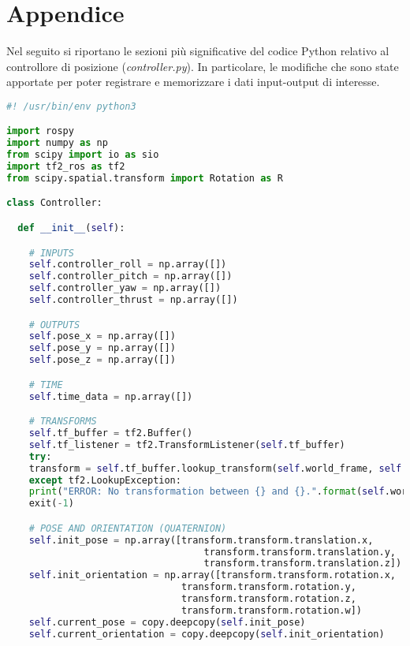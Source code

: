 
\chapter*{Appendice}\label{ch:appendix}

Nel seguito si riportano le sezioni più significative del codice Python relativo al controllore di posizione (\emph{controller.py}). In particolare, le modifiche che sono state apportate per poter registrare e memorizzare i dati input-output di interesse.\\

\begin{lstlisting}[language=Python, numbers=none]
#! /usr/bin/env python3

import rospy
import numpy as np
from scipy import io as sio
import tf2_ros as tf2
from scipy.spatial.transform import Rotation as R

class Controller:

  def __init__(self):

    # INPUTS
    self.controller_roll = np.array([])
    self.controller_pitch = np.array([])
    self.controller_yaw = np.array([])
    self.controller_thrust = np.array([])

    # OUTPUTS
    self.pose_x = np.array([])
    self.pose_y = np.array([])
    self.pose_z = np.array([])

    # TIME
    self.time_data = np.array([])

    # TRANSFORMS
    self.tf_buffer = tf2.Buffer()
    self.tf_listener = tf2.TransformListener(self.tf_buffer)
    try:
    transform = self.tf_buffer.lookup_transform(self.world_frame, self.drone_frame, rospy.Time(0), rospy.Duration(5))
    except tf2.LookupException:
    print("ERROR: No transformation between {} and {}.".format(self.world_frame, self.drone_frame))
    exit(-1)

    # POSE AND ORIENTATION (QUATERNION)
    self.init_pose = np.array([transform.transform.translation.x,
                                   transform.transform.translation.y,
                                   transform.transform.translation.z])
    self.init_orientation = np.array([transform.transform.rotation.x,
                               transform.transform.rotation.y,
                               transform.transform.rotation.z,
                               transform.transform.rotation.w])
    self.current_pose = copy.deepcopy(self.init_pose)
    self.current_orientation = copy.deepcopy(self.init_orientation)
  

\end{lstlisting}
